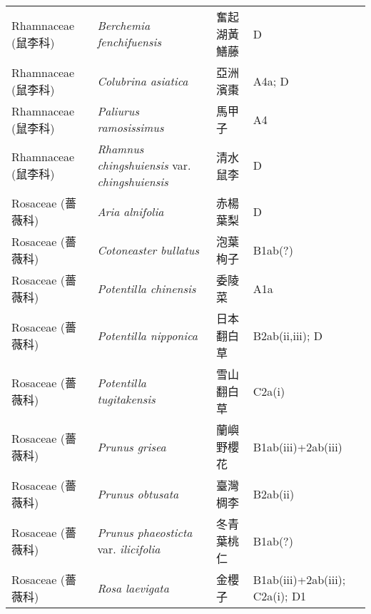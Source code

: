 \begin{longtable}{p{3cm}p{5cm}p{3cm}p{4cm}}
    Rhamnaceae (鼠李科) & \textit{Berchemia fenchifuensis}  & 奮起湖黃鱔藤 & D \index{Berchemia@\textit{Berchemia}!fenchifuensis@\textit{fenchifuensis}}  \index{奮起湖黃鱔藤} \\
    Rhamnaceae (鼠李科) & \textit{Colubrina asiatica}  & 亞洲濱棗 & A4a; D \index{Colubrina@\textit{Colubrina}!asiatica@\textit{asiatica}}  \index{亞洲濱棗} \\
    Rhamnaceae (鼠李科) & \textit{Paliurus ramosissimus}  & 馬甲子 & A4 \index{Paliurus@\textit{Paliurus}!ramosissimus@\textit{ramosissimus}}  \index{馬甲子} \\
    Rhamnaceae (鼠李科) & \textit{Rhamnus chingshuiensis} var. \textit{chingshuiensis}  & 清水鼠李 & D \index{Rhamnus@\textit{Rhamnus}!chingshuiensis@\textit{chingshuiensis}!var. chingshuiensis@var. \textit{chingshuiensis}}  \index{清水鼠李} \\
    Rosaceae (薔薇科) & \textit{Aria alnifolia}  & 赤楊葉梨 & D \index{Aria@\textit{Aria}!alnifolia@\textit{alnifolia}}  \index{赤楊葉梨} \\
    Rosaceae (薔薇科) & \textit{Cotoneaster bullatus}  & 泡葉栒子 & B1ab(?) \index{Cotoneaster@\textit{Cotoneaster}!bullatus@\textit{bullatus}}  \index{泡葉栒子} \\
    Rosaceae (薔薇科) & \textit{Potentilla chinensis}  & 委陵菜 & A1a \index{Potentilla@\textit{Potentilla}!chinensis@\textit{chinensis}}  \index{委陵菜} \\
    Rosaceae (薔薇科) & \textit{Potentilla nipponica}  & 日本翻白草 & B2ab(ii,iii); D \index{Potentilla@\textit{Potentilla}!nipponica@\textit{nipponica}}  \index{日本翻白草} \\
    Rosaceae (薔薇科) & \textit{Potentilla tugitakensis}  & 雪山翻白草 & C2a(i) \index{Potentilla@\textit{Potentilla}!tugitakensis@\textit{tugitakensis}}  \index{雪山翻白草} \\
    Rosaceae (薔薇科) & \textit{Prunus grisea}  & 蘭嶼野櫻花 & B1ab(iii)+2ab(iii) \index{Prunus@\textit{Prunus}!grisea@\textit{grisea}}  \index{蘭嶼野櫻花} \\
    Rosaceae (薔薇科) & \textit{Prunus obtusata}  & 臺灣椆李 & B2ab(ii) \index{Prunus@\textit{Prunus}!obtusata@\textit{obtusata}}  \index{臺灣椆李} \\
    Rosaceae (薔薇科) & \textit{Prunus phaeosticta} var. \textit{ilicifolia}  & 冬青葉桃仁 & B1ab(?) \index{Prunus@\textit{Prunus}!phaeosticta@\textit{phaeosticta}!var. ilicifolia@var. \textit{ilicifolia}}  \index{冬青葉桃仁} \\
    Rosaceae (薔薇科) & \textit{Rosa laevigata}  & 金櫻子 & B1ab(iii)+2ab(iii); C2a(i); D1 \index{Rosa@\textit{Rosa}!laevigata@\textit{laevigata}}  \index{金櫻子} \\

\end{longtable}
